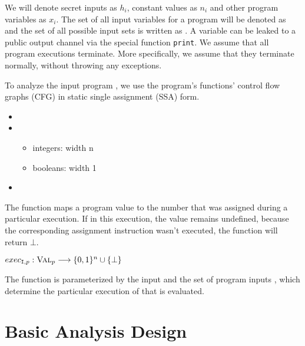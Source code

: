 We will denote secret inputs as $h_i$, constant values as $n_i$ and other program variables as $x_i$. The set of all input variables for a program will be denoted as \In and the set of all possible input sets is written as \allIn. A variable can be leaked to a public output channel via the special function \texttt{print}. We assume that all program executions terminate. More specifically, we assume that they terminate normally, without throwing any exceptions.

To analyze the input program \p, we use the program's functions' control flow graphs (CFG) in static single assignment (SSA) form.

\begin{itemize}
    \item {}
    \item {}
    \begin{itemize}
        \item integers: width n
        \item booleans: width 1
    \end{itemize}
    \item {}
\end{itemize}

\begin{definition}
The function maps a program value to the number that was assigned during a particular execution. If in this execution, the value remains undefined, because the corresponding assignment instruction wasn't executed, the function will return $\bot$.
    \begin{center}
        $exec_{\mathtt{I}, p}: \textsc{Val}_p \longrightarrow \{0, 1\}^n \cup \{\bot\}$
    \end{center}
The function is parameterized by the input \p and the set of program inputs \I, which determine the particular execution of \p that is evaluated.
\end{definition}

\begin{definition}

    
\end{definition}

\section{Basic Analysis Design}

